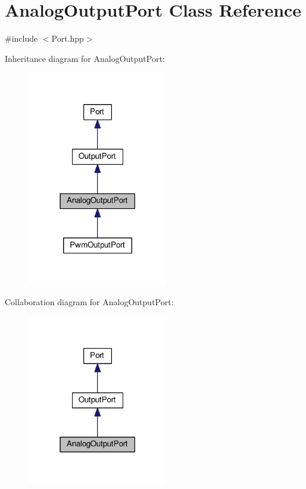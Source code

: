 \hypertarget{classAnalogOutputPort}{}\section{Analog\+Output\+Port Class Reference}
\label{classAnalogOutputPort}


{\ttfamily \#include $<$Port.\+hpp$>$}



Inheritance diagram for Analog\+Output\+Port\+:\nopagebreak
\begin{figure}[H]
\begin{center}
\leavevmode
\includegraphics[width=174pt]{classAnalogOutputPort__inherit__graph}
\end{center}
\end{figure}


Collaboration diagram for Analog\+Output\+Port\+:\nopagebreak
\begin{figure}[H]
\begin{center}
\leavevmode
\includegraphics[width=174pt]{classAnalogOutputPort__coll__graph}
\end{center}
\end{figure}
